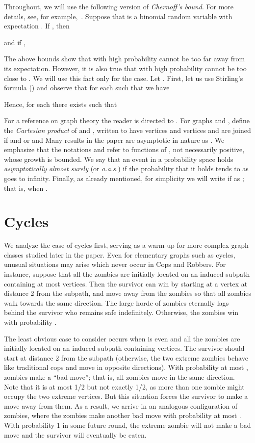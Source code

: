 \documentclass[12pt]{amsart}
\begin{document}
\bigskip

Throughout, we will use the following version of \emph{Chernoff's bound}. For more details, see, for example,~\cite{JLR}. Suppose that  is a binomial random variable with expectation
. If , then

and if ,


The above bounds show that with high probability  cannot be too far away from its expectation. However, it is also true that with high probability  cannot be too close to . We will use this fact only for the  case. Let . First, let us use Stirling's formula () and observe that for each  such that  we have

Hence, for each  there exists  such that


\bigskip

For a reference on graph theory the reader is directed to \cite{west}. For graphs  and , define the \emph{Cartesian product} of  and , written  to have vertices  and vertices  and  are joined if  and  or  and  Many results in the paper are asymptotic in nature as . We emphasize that the notations  and  refer to functions of , not necessarily positive, whose growth is bounded. We say that an event in a probability space holds
\emph{asymptotically almost surely} (or \emph{a.a.s.}) if the probability that it holds tends to  as  goes to infinity. Finally, as already mentioned, for simplicity we will write  if  as ; that is, when .

\section{Cycles}\label{seccycle}
We analyze the case of cycles  first, serving as a warm-up for more complex graph classes studied later in the paper.
Even for elementary graphs such as cycles, unusual situations may arise which never occur in Cops and Robbers. For instance, suppose that all the zombies are initially located on an induced subpath
containing at most  vertices.  Then the survivor can win by starting at a vertex at distance 2 from the subpath, and move away from the zombies so that all zombies walk towards the same direction.
The large horde of zombies eternally lags behind the survivor who remains safe indefinitely. Otherwise, the zombies win with probability . 

The least obvious case to consider occurs when  is even and all the zombies are initially located on an induced subpath containing  vertices. The survivor should start at distance 2 from the subpath (otherwise, the two extreme zombies behave like traditional cops and move in opposite directions). With probability at most ,  zombies make a ``bad move''; that is, all zombies move in the same direction. Note that it is at most 1/2 but not exactly 1/2, as more than one zombie might occupy the two extreme vertices.  But this situation forces the survivor to make a move away from them. As a result, we arrive in an analogous configuration of zombies, where the zombies make another bad move with probability at most . With probability 1 in some future round, the extreme zombie will not make a bad move and the survivor will eventually be eaten.
\end{document}
